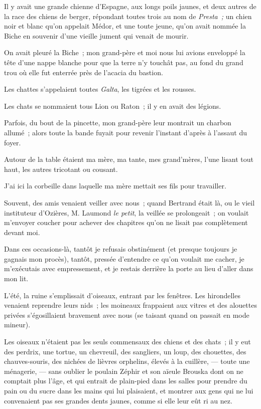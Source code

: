 \documentclass[french,twoside]{book} %
\begin{document}
Il y avait une grande chienne d’Espagne, aux longs poils jaunes, et deux autres de la race des chiens de berger, répondant toutes trois au nom de \emph{Presta ;} un chien noir et blanc qu’on appelait Médor, et une toute jeune, qu’on avait nommée la Biche en souvenir d’une vieille jument qui venait de mourir.\par
On avait pleuré la Biche ; mon grand-père et moi nous lui avions enveloppé la tête d’une nappe blanche pour que la terre n’y touchât pas, au fond du grand trou où elle fut enterrée près de l’acacia du bastion.\par
Les chattes s’appelaient toutes \emph{Galta}, les tigrées et les rousses.\par
Les chats se nommaient tous Lion ou Raton ; il y en avait des légions.\par
Parfois, du bout de la pincette, mon grand-père leur montrait un charbon allumé ; alors toute la bande fuyait pour revenir l’instant d’après à l’assaut du foyer.\par
Autour de la table étaient ma mère, ma tante, mes grand’mères, l’une lisant tout haut, les autres tricotant ou cousant.\par
 J’ai ici la corbeille dans laquelle ma mère mettait ses fils pour travailler.\par
Souvent, des amis venaient veiller avec nous ; quand Bertrand était là, ou le vieil instituteur d’Ozières, M. Laumond \emph{le petit}, la veillée se prolongeait ; on voulait m’envoyer coucher pour achever des chapitres qu’on ne lisait pas complètement devant moi.\par
Dans ces occasions-là, tantôt je refusais obstinément (et presque toujours je gagnais mon procès), tantôt, pressée d’entendre ce qu’on voulait me cacher, je m’exécutais avec empressement, et je restais derrière la porte au lieu d’aller dans mon lit.\par
L’été, la ruine s’emplissait d’oiseaux, entrant par les fenêtres. Les hirondelles venaient reprendre leurs nids ; les moineaux frappaient aux vitres et des alouettes privées s’égosillaient bravement avec nous (se taisant quand on passait en mode mineur).\par
Les oiseaux n’étaient pas les seuls commensaux des chiens et des chats ; il y eut des perdrix, une tortue, un chevreuil, des sangliers, un loup, des chouettes, des chauves-souris, des nichées de lièvres orphelins, élevés à la cuillère, — toute une ménagerie, — sans oublier le poulain Zéphir et son aïeule Brouska dont on ne  comptait plus l’âge, et qui entrait de plain-pied dans les salles pour prendre du pain ou du sucre dans les mains qui lui plaisaient, et montrer aux gens qui ne lui convenaient pas ses grandes dents jaunes, comme si elle leur eût ri au nez.\par
\end{document}
